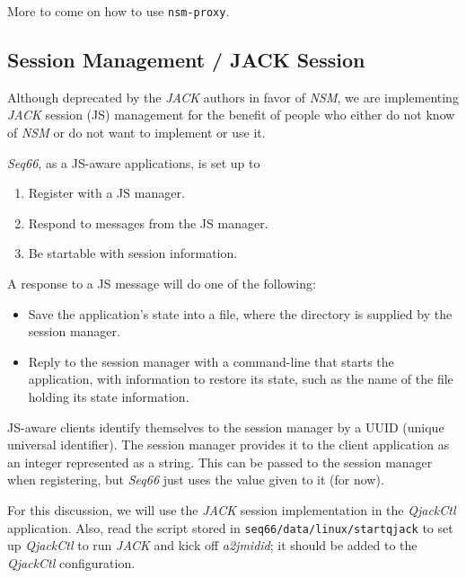    More to come on how to use \texttt{nsm-proxy}.

\subsection{Session Management / JACK Session}
\label{subsec:sessions_jack}

   Although deprecated by the \textsl{JACK} authors in favor of \textsl{NSM},
   we are implementing \textsl{JACK} session (JS) management for the benefit of
   people who either do not know of \textsl{NSM} or do not want to implement or
   use it.

   \textsl{Seq66}, as a JS-aware applications, is set up to

   \begin{enumerate}
      \item Register with a JS manager.
      \item Respond to messages from the JS manager.
      \item Be startable with session information.
   \end{enumerate}

   A response to a JS message will do one of the following:

   \begin{itemize}
      \item Save the application's state into a file, where the directory is
         supplied by the session manager.
      \item Reply to the session manager with a command-line that starts the
         application, with information to restore its state, such as
         the name of the file holding its state information.
   \end{itemize}

	JS-aware clients identify themselves to the session manager by a UUID
	(unique universal identifier). The session manager provides it to
	the client application as an integer represented as a string.
   This can be passed to the session manager when registering, but
   \textsl{Seq66} just uses the value given to it (for now).


   For this discussion, we will use the \textsl{JACK} session implementation in
   the \textsl{QjackCtl} application.
   Also, read the script stored in
   \texttt{seq66/data/linux/startqjack} to set up
   \textsl{QjackCtl} to run \textsl{JACK} and kick off
   \textsl{a2jmidid}; it should be added to the \textsl{QjackCtl}
   configuration.

